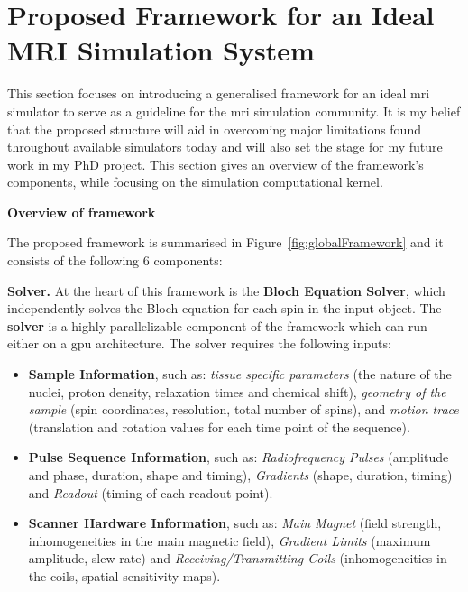 \section{Proposed Framework for an Ideal MRI Simulation System}
\label{chapterlabel4sec3}

This section focuses on introducing a generalised framework for an ideal \ac{mri} simulator to serve as a guideline for the \ac{mri} simulation community.
It is my belief that the proposed structure will aid in overcoming major limitations found throughout available simulators today and will also set the stage for my future work in my PhD project.
This section gives an overview of the framework's components, while focusing on the simulation computational kernel.

\hfill

\large \textbf{Overview of framework} \normalsize

The proposed framework is summarised in Figure~\ref{fig:globalFramework} and it consists of the following 6 components:

\hfill

\textbf{Solver.} At the heart of this framework is the \textbf{Bloch Equation Solver}, which independently solves the Bloch equation for each spin in the input object.
The \textbf{solver} is a highly parallelizable component of the framework which can run either on a \ac{gpu} architecture.
The solver requires the following inputs:
\begin{itemize}
    \item \textbf{Sample Information}, such as:
    \textit{tissue specific parameters} (the nature of the nuclei, proton density, relaxation times and chemical shift), 
    \textit{geometry of the sample} (spin coordinates, resolution, total number of spins), and 
    \textit{motion trace} (translation and rotation values for each time point of the sequence).
    
    \item \textbf{Pulse Sequence Information}, such as:
    \textit{Radiofrequency Pulses} (amplitude and phase, duration, shape and timing), 
    \textit{Gradients} (shape, duration, timing) and
    \textit{Readout} (timing of each readout point).
    
    \item \textbf{Scanner Hardware Information}, such as:
    \textit{Main Magnet} (field strength, inhomogeneities in the main magnetic field),
    \textit{Gradient Limits} (maximum amplitude, slew rate) and
    \textit{Receiving/Transmitting Coils} (inhomogeneities in the coils, spatial sensitivity maps). 
\end{itemize}

